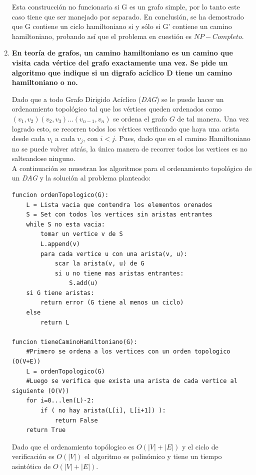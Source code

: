 \documentclass{article}
\newcommand\tab[1][0.5cm]{\hspace*{#1}}
\begin{document}
\begin{enumerate}
             \tab Esta construcción no funcionaria si G es un grafo simple, por lo tanto este caso tiene que ser manejado por separado. En conclusión,
             se ha demostrado que G contiene un ciclo hamiltoniano si y sólo si G’ contiene un camino hamiltoniano, probando así que el problema en
             cuestión es $NP-Completo$.

        \item \textbf{En teoría de grafos, un camino hamiltoniano es un camino que visita cada vértice del grafo exactamente
            una vez. Se pide un algoritmo que indique si un digrafo acíclico D tiene un camino hamiltoniano o no.} %

            \tab Dado que a todo Grafo Dirigido Acíclico (\emph{DAG}) se le puede hacer un ordenamiento topológico tal que los
            vértices queden ordenados como $(v_{1}, v_{2})(v_{2},v_{3})...(v_{n-1}, v_{n})$ se ordena el grafo $G$ de tal manera.
            Una vez logrado esto, se recorren todos los vértices verificando que haya una arista desde cada $v_{i}$ a cada $v_{j}$,
            con $i < j$. Pues, dado que en el camino Hamiltoniano no se puede volver atrás, la única manera de recorrer todos los vertices
            es no salteandose ninguno. \\
            \tab A continuación se muestran los algoritmos para el ordenamiento topológico de un \emph{DAG} y la solución
            al problema planteado:
            \begin{lstlisting}
funcion ordenTopologico(G):
    L = Lista vacia que contendra los elementos orenados
    S = Set con todos los vertices sin aristas entrantes
    while S no esta vacia:
        tomar un vertice v de S
        L.append(v)
        para cada vertice u con una arista(v, u):
            scar la arista(v, u) de G
            si u no tiene mas aristas entrantes:
                S.add(u)
    si G tiene aristas:
        return error (G tiene al menos un ciclo)
    else
        return L

funcion tieneCaminoHamiltoniano(G):
    #Primero se ordena a los vertices con un orden topologico (O(V+E))
    L = ordenTopologico(G)
    #Luego se verifica que exista una arista de cada vertice al siguiente (O(V))
    for i=0...len(L)-2:
        if ( no hay arista(L[i], L[i+1]) ):
            return False
    return True
            \end{lstlisting}
            \tab Dado que el ordenamiento topólogico es $O(|V| + |E|)$ y el ciclo de verificación es $O(|V|)$
            el algoritmo es polinómico y tiene un tiempo asintótico de $O(|V|+|E|)$.



\end{enumerate}
\end{document}
